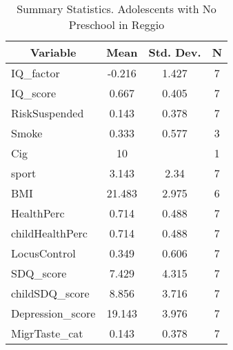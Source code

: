 
\begin{table}[htbp]\centering \caption{Summary Statistics. Adolescents with No Preschool in Reggio \label{bothAdolmaternaNoneReggio}}
\begin{tabular}{l c c  c}\hline\hline
\multicolumn{1}{c}{\textbf{Variable}} & \textbf{Mean}
 & \textbf{Std. Dev.} & \textbf{N}\\ \hline
IQ\_factor & -0.216 & 1.427  & 7\\
IQ\_score & 0.667 & 0.405  & 7\\
RiskSuspended & 0.143 & 0.378  & 7\\
Smoke & 0.333 & 0.577  & 3\\
Cig & 10 &   & 1\\
sport & 3.143 & 2.34  & 7\\
BMI & 21.483 & 2.975  & 6\\
HealthPerc & 0.714 & 0.488  & 7\\
childHealthPerc & 0.714 & 0.488  & 7\\
LocusControl & 0.349 & 0.606  & 7\\
SDQ\_score & 7.429 & 4.315  & 7\\
childSDQ\_score & 8.856 & 3.716  & 7\\
Depression\_score & 19.143 & 3.976  & 7\\
MigrTaste\_cat & 0.143 & 0.378  & 7\\
\hline\end{tabular}
\end{table}
